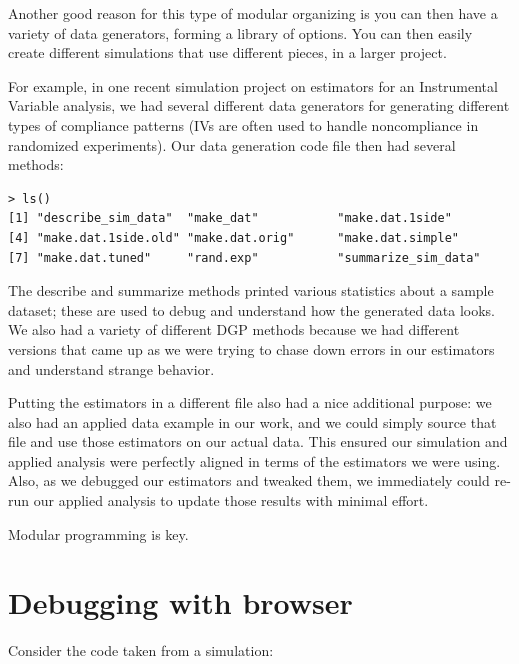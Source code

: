 \documentclass[
]{book}
\newenvironment{Shaded}{\begin{snugshade}}{\end{snugshade}}
\newcommand{\ControlFlowTok}[1]{\textcolor[rgb]{0.13,0.29,0.53}{\textbf{#1}}}
\newcommand{\FunctionTok}[1]{\textcolor[rgb]{0.13,0.29,0.53}{\textbf{#1}}}
\newcommand{\NormalTok}[1]{#1}
\newcommand{\SpecialCharTok}[1]{\textcolor[rgb]{0.81,0.36,0.00}{\textbf{#1}}}
\begin{document}
Another good reason for this type of modular organizing is you can then have a variety of data generators, forming a library of options.
You can then easily create different simulations that use different pieces, in a larger project.

For example, in one recent simulation project on estimators for an Instrumental Variable analysis, we had several different data generators for generating different types of compliance patterns (IVs are often used to handle noncompliance in randomized experiments).
Our data generation code file then had several methods:

\begin{verbatim}
> ls()
[1] "describe_sim_data"  "make_dat"           "make.dat.1side"     
[4] "make.dat.1side.old" "make.dat.orig"      "make.dat.simple"
[7] "make.dat.tuned"     "rand.exp"           "summarize_sim_data"
\end{verbatim}

The describe and summarize methods printed various statistics about a sample dataset; these are used to debug and understand how the generated data looks.
We also had a variety of different DGP methods because we had different versions that came up as we were trying to chase down errors in our estimators and understand strange behavior.

Putting the estimators in a different file also had a nice additional purpose: we also had an applied data example in our work, and we could simply source that file and use those estimators on our actual data.
This ensured our simulation and applied analysis were perfectly aligned in terms of the estimators we were using.
Also, as we debugged our estimators and tweaked them, we immediately could re-run our applied analysis to update those results with minimal effort.

Modular programming is key.

\section{Debugging with browser}\label{debugging-with-browser}

Consider the code taken from a simulation:

\begin{Shaded}
\end{Shaded}
\end{document}
